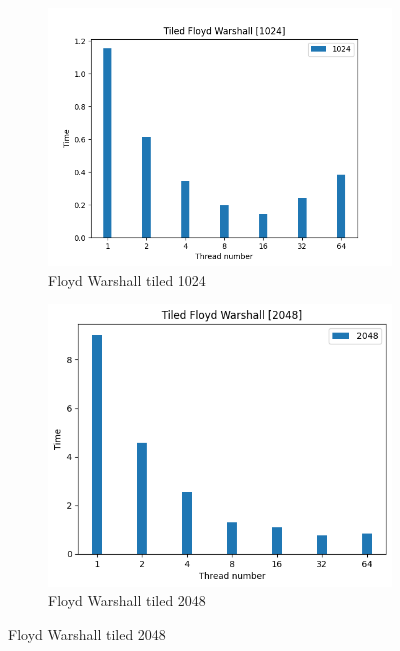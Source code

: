 \documentclass{article}
\newcommand{\eng}[1]{#1}
\begin{document}
\begin{figure}[h]
    \centering
    \begin{subfigure}{0.49\textwidth}
        \includegraphics[width=\textwidth]{a2/plots/fw_tiled_1024.png}
        \caption{\eng{Floyd Warshall tiled} 1024}
        \label{fig:fw_tiled_1024}
    \end{subfigure}
    \begin{subfigure}{0.49\textwidth}
        \includegraphics[width=\textwidth]{a2/plots/fw_tiled_2048.png}
        \caption{\eng{Floyd Warshall tiled} 2048}
        \label{fig:fw_tiled_2048}
    \end{subfigure}

\end{figure}
\end{document}
